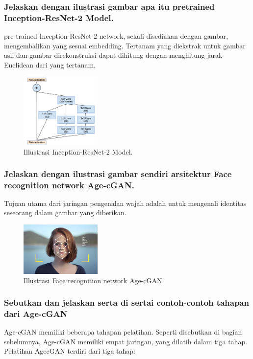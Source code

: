 \subsubsection{Jelaskan dengan ilustrasi gambar apa itu pretrained Inception-ResNet-2 Model.}
\hfill \break
pre-trained Inception-ResNet-2 network, sekali disediakan dengan gambar, mengembalikan yang sesuai embedding. Tertanam yang diekstrak untuk gambar asli dan gambar direkonstruksi dapat dihitung dengan menghitung jarak Euclidean dari yang tertanam.
	\begin{figure}[H]
		\includegraphics[width=4cm]{figures/1174066/9/6.png}
		\centering
		\caption{Illustrasi Inception-ResNet-2 Model.}
	\end{figure}
	
\subsubsection{Jelaskan dengan ilustrasi gambar sendiri arsitektur Face recognition network Age-cGAN.}
\hfill \break
Tujuan utama dari jaringan pengenalan wajah adalah untuk mengenali identitas seseorang dalam gambar yang diberikan.
\begin{figure}[H]
		\includegraphics[width=4cm]{figures/1174066/9/7.jpg}
		\centering
		\caption{Illustrasi Face recognition network Age-cGAN.} 
\end{figure}

\subsubsection{Sebutkan dan jelaskan serta di sertai contoh-contoh tahapan dari Age-cGAN}
\hfill \break
Age-cGAN memiliki beberapa tahapan pelatihan. Seperti disebutkan di bagian sebelumnya, Age-cGAN memiliki empat jaringan, yang dilatih dalam tiga tahap. Pelatihan AgecGAN terdiri dari tiga tahap:

